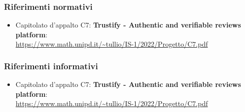     \subsubsection{Riferimenti normativi}
        \begin{itemize}
            \item Capitolato d'appalto C7: \textbf{Trustify - Authentic and verifiable reviews platform}: \\
            \url{https://www.math.unipd.it/~tullio/IS-1/2022/Progetto/C7.pdf}
        \end{itemize}
    \subsubsection{Riferimenti informativi}
    \begin{itemize}
        \item Capitolato d'appalto C7: \textbf{Trustify - Authentic and verifiable reviews platform}: \\
        \url{https://www.math.unipd.it/~tullio/IS-1/2022/Progetto/C7.pdf}
    \end{itemize}